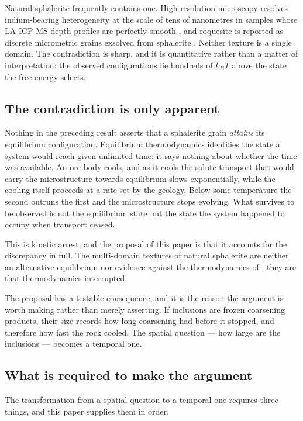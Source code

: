 \documentclass[11pt,a4paper]{article}
\begin{document}
Natural sphalerite frequently contains one. High-resolution microscopy resolves
indium-bearing heterogeneity at the scale of tens of nanometres in samples whose
LA-ICP-MS depth profiles are perfectly smooth \citep{cook2009,frenzel2016}, and
roquesite is reported as discrete micrometric grains exsolved from sphalerite
\citep{moura2007}. Neither texture is a single domain. The contradiction is
sharp, and it is quantitative rather than a matter of interpretation: the
observed configurations lie hundreds of $k_BT$ above the state the free energy
selects.

\subsection{The contradiction is only apparent}

Nothing in the preceding result asserts that a sphalerite grain \emph{attains}
its equilibrium configuration. Equilibrium thermodynamics identifies the state a
system would reach given unlimited time; it says nothing about whether the time
was available. An ore body cools, and as it cools the solute transport that
would carry the microstructure towards equilibrium slows exponentially, while
the cooling itself proceeds at a rate set by the geology. Below some
temperature the second outruns the first and the microstructure stops evolving.
What survives to be observed is not the equilibrium state but the state the
system happened to occupy when transport ceased.

This is kinetic arrest, and the proposal of this paper is that it accounts for
the discrepancy in full. The multi-domain textures of natural sphalerite are
neither an alternative equilibrium nor evidence against the thermodynamics of
\citet{yu2026b}; they are that thermodynamics interrupted.

The proposal has a testable consequence, and it is the reason the argument is
worth making rather than merely asserting. If inclusions are frozen coarsening
products, their size records how long coarsening had before it stopped, and
therefore how fast the rock cooled. The spatial question --- how large are the
inclusions --- becomes a temporal one.

\subsection{What is required to make the argument}

The transformation from a spatial question to a temporal one requires three
things, and this paper supplies them in order.
\end{document}
